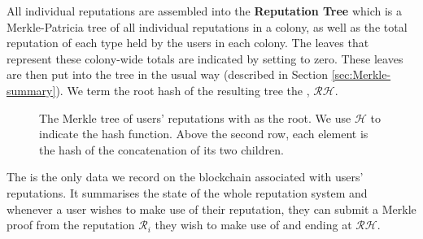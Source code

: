 All individual reputations are assembled into the \textbf{Reputation Tree} which is a Merkle-Patricia tree of all individual reputations in a colony, as well as the total reputation of each type held by the users in each colony. The leaves that represent these colony-wide totals are indicated by setting  to zero. These leaves are then put into the tree in the usual way (described in Section \ref{sec:Merkle-summary}). We term the root hash of the resulting tree the , $\mathcal{RH}$.
\begin{figure}
\centering
{}
\caption{The Merkle tree of users' reputations with  as the root. We use $\mathcal{H}$ to indicate the  hash function. Above the second row, each element is the hash of the concatenation of its two children.}
\end{figure}


The  is the only data we record on the blockchain associated with users' reputations. It summarises the state of the whole reputation system and whenever a user wishes to make use of their reputation, they can submit a Merkle proof from the reputation $\mathcal{R}_i$ they wish to make use of and ending at $\mathcal{RH}$.


